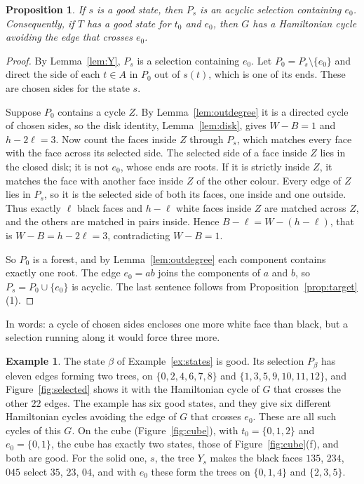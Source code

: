 \documentclass[10pt]{amsart}
\numberwithin{equation}{section}
\newtheorem{proposition}[equation]{Proposition}
\theoremstyle{definition}
\newtheorem{example}[equation]{Example}
\theoremstyle{remark}
\newcommand{\T}{T}
\begin{document}
\begin{proposition}\label{prop:recover}
If $s$ is a good state, then $P_s$ is an acyclic selection containing $e_0$.
Consequently, if $\T$ has a good state for $t_0$ and $e_0$, then $G$ has a Hamiltonian cycle avoiding the edge that crosses $e_0$.
\end{proposition}

\begin{proof}
By Lemma~\ref{lem:Y}, $P_s$ is a selection containing $e_0$.
Let $P_0=P_s\setminus\{e_0\}$ and direct the side of each $t\in A$ in $P_0$ out of $s(t)$, which is one of its ends.
These are chosen sides for the state $s$.

Suppose $P_0$ contains a cycle $Z$.
By Lemma~\ref{lem:outdegree} it is a directed cycle of chosen sides, so the disk identity, Lemma~\ref{lem:disk}, gives $W-B=1$ and $h-2\ell=3$.
Now count the faces inside $Z$ through $P_s$, which matches every face with the face across its selected side.
The selected side of a face inside $Z$ lies in the closed disk; it is not $e_0$, whose ends are roots.
If it is strictly inside $Z$, it matches the face with another face inside $Z$ of the other colour.
Every edge of $Z$ lies in $P_s$, so it is the selected side of both its faces, one inside and one outside.
Thus exactly $\ell$ black faces and $h-\ell$ white faces inside $Z$ are matched across $Z$, and the others are matched in pairs inside.
Hence $B-\ell=W-(h-\ell)$, that is $W-B=h-2\ell=3$, contradicting $W-B=1$.

So $P_0$ is a forest, and by Lemma~\ref{lem:outdegree} each component contains exactly one root.
The edge $e_0=ab$ joins the components of $a$ and $b$, so $P_s=P_0\cup\{e_0\}$ is acyclic.
The last sentence follows from Proposition~\ref{prop:target}(1).
\end{proof}

In words: a cycle of chosen sides encloses one more white face than black, but a selection running along it would force three more.

\begin{example}\label{ex:recover}
The state $\beta$ of Example~\ref{ex:states} is good.
Its selection $P_\beta$ has eleven edges forming two trees, on $\{0,2,4,6,7,8\}$ and $\{1,3,5,9,10,11,12\}$, and Figure~\ref{fig:selected} shows it with the Hamiltonian cycle of $G$ that crosses the other $22$ edges.
The example has six good states, and they give six different Hamiltonian cycles avoiding the edge of $G$ that crosses $e_0$. These are all such cycles of this $G$.
On the cube (Figure~\ref{fig:cube}), with $t_0=\{0,1,2\}$ and $e_0=\{0,1\}$, the cube has exactly two states, those of Figure~\ref{fig:cube}(f), and both are good. For the solid one, $s$, the tree $Y_s$ makes the black faces $135$, $234$, $045$ select $35$, $23$, $04$, and with $e_0$ these form the trees on $\{0,1,4\}$ and $\{2,3,5\}$.
\end{example}
\end{document}
